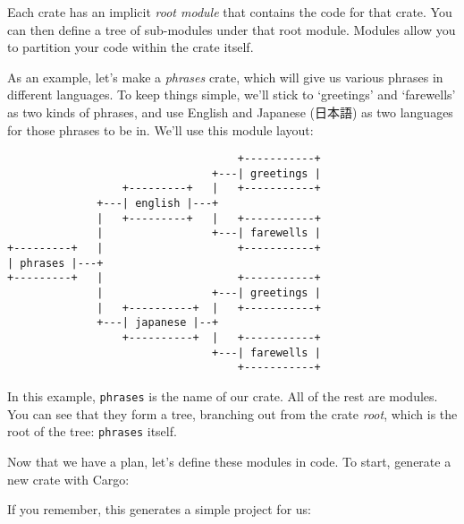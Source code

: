 \documentclass[a4paper,]{book}
\newenvironment{Shaded}{\begin{snugshade}}{\end{snugshade}}
\newcommand{\KeywordTok}[1]{\textcolor[rgb]{0.13,0.29,0.53}{\textbf{{#1}}}}
\newcommand{\NormalTok}[1]{{#1}}
\begin{document}
Each crate has an implicit \emph{root module} that contains the code for
that crate. You can then define a tree of sub-modules under that root
module. Modules allow you to partition your code within the crate
itself.

As an example, let's make a \emph{phrases} crate, which will give us
various phrases in different languages. To keep things simple, we'll
stick to `greetings' and `farewells' as two kinds of phrases, and use
English and Japanese (日本語) as two languages for those phrases to be
in. We'll use this module layout:

\begin{verbatim}
                                    +-----------+
                                +---| greetings |
                  +---------+   |   +-----------+
              +---| english |---+
              |   +---------+   |   +-----------+
              |                 +---| farewells |
+---------+   |                     +-----------+
| phrases |---+
+---------+   |                     +-----------+
              |                 +---| greetings |
              |   +----------+  |   +-----------+
              +---| japanese |--+
                  +----------+  |   +-----------+
                                +---| farewells |
                                    +-----------+
\end{verbatim}

In this example, \texttt{phrases} is the name of our crate. All of the
rest are modules. You can see that they form a tree, branching out from
the crate \emph{root}, which is the root of the tree: \texttt{phrases}
itself.

Now that we have a plan, let's define these modules in code. To start,
generate a new crate with Cargo:

\begin{Shaded}
\end{Shaded}

If you remember, this generates a simple project for us:

\begin{Shaded}
\end{Shaded}
\end{document}
